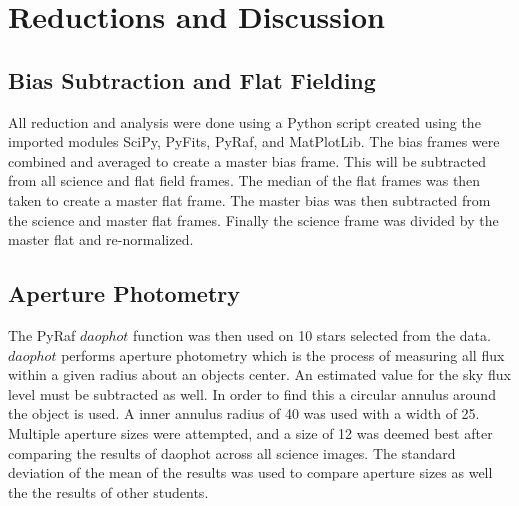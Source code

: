 \documentclass{article}
\begin{document}
\section{Reductions and Discussion}
\subsection{Bias Subtraction and Flat Fielding}
All reduction and analysis were done using a Python script created using the imported modules SciPy, PyFits, PyRaf, and MatPlotLib. The bias frames were combined and averaged to create a master bias frame. This will be subtracted from all science and flat field frames. The median of the flat frames was then taken to create a master flat frame. The master bias was then subtracted from the science and master flat frames. Finally the science frame was divided by the master flat and re-normalized.
\subsection{Aperture Photometry}
The PyRaf $daophot$ function was then used on 10 stars selected from the data. $daophot$ performs aperture photometry which is the process of measuring all flux within a given radius about an objects center. An estimated value for the sky flux level must be subtracted as well. In order to find this a circular annulus around the object is used. A inner annulus radius of 40 was used with a width of 25. Multiple aperture sizes were attempted, and a size of 12 was deemed best after comparing the results of daophot across all science images. The standard deviation of the mean of the results was used to compare aperture sizes as well the the results of other students.\\
\end{document}
